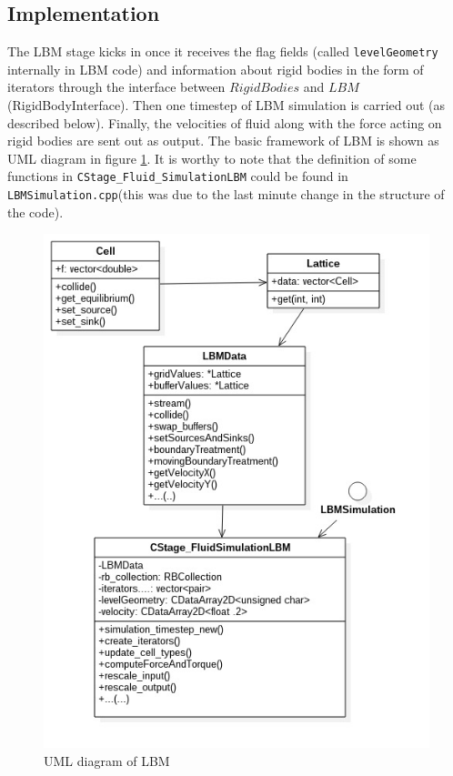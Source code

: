 \subsection{Implementation}
The LBM stage kicks in once it receives the flag fields (called \texttt{levelGeometry} internally in LBM code) and information about rigid bodies in the form of iterators through the interface between $RigidBodies$ and $LBM$ (RigidBodyInterface). Then one timestep of LBM simulation is 
carried out (as described below). Finally, the velocities of fluid along with
the force acting on rigid bodies are sent out as output. The basic framework of
LBM is shown as UML diagram in figure \ref{fig: LBMUMLgraph}. It is worthy to note that the 
definition of some functions in \texttt{CStage_Fluid_SimulationLBM} could be found in \texttt{LBMSimulation.cpp}(this was due to the last minute change in the structure of the code).
\begin{figure}[ht]
	\centering
	\includegraphics[scale=0.5]{img/LBM/LBM_uml.jpg}
	\caption{UML diagram of LBM}
	\label{fig: LBMUMLgraph}
\end{figure} 
